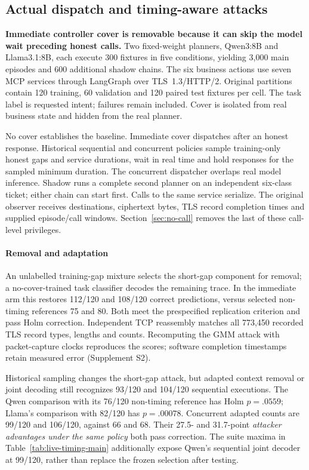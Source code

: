 \subsection{Actual dispatch and timing-aware attacks}\label{sec:cover-study}
\textbf{Immediate controller cover is removable because it can skip the model wait preceding honest calls.}
Two fixed-weight planners, Qwen3:8B and Llama3.1:8B, each execute 300 fixtures in five conditions, yielding 3,000 main episodes and 600 additional shadow chains. The six business actions use seven MCP services through LangGraph over TLS~1.3/HTTP/2. Original partitions contain 120 training, 60 validation and 120 paired test fixtures per cell. The task label is requested intent; failures remain included. Cover is isolated from real business state and hidden from the real planner.

No cover establishes the baseline. Immediate cover dispatches after an honest response. Historical sequential and concurrent policies sample training-only honest gaps and service durations, wait in real time and hold responses for the sampled minimum duration. The concurrent dispatcher overlaps real model inference. Shadow runs a complete second planner on an independent six-class ticket; either chain can start first. Calls to the same service serialize. The original observer receives destinations, ciphertext bytes, TLS record completion times and supplied episode/call windows. Section~\ref{sec:no-call} removes the last of these call-level privileges.



\paragraph{Removal and adaptation}
An unlabelled training-gap mixture selects the short-gap component for removal; a no-cover-trained task classifier decodes the remaining trace. In the immediate arm this restores 112/120 and 108/120 correct predictions, versus selected non-timing references 75 and 80. Both meet the prespecified replication criterion and pass Holm correction. Independent TCP reassembly matches all 773,450 recorded TLS record types, lengths and counts. Recomputing the GMM attack with packet-capture clocks reproduces the scores; software completion timestamps retain measured error (Supplement S2).

Historical sampling changes the short-gap attack, but adapted context removal or joint decoding still recognizes 93/120 and 104/120 sequential executions. The Qwen comparison with its 76/120 non-timing reference has Holm $p=.0559$; Llama's comparison with 82/120 has $p=.00078$. Concurrent adapted counts are 99/120 and 106/120, against 66 and 68. Their 27.5- and 31.7-point \emph{attacker advantages under the same policy} both pass correction. The suite maxima in Table~\ref{tab:live-timing-main} additionally expose Qwen's sequential joint decoder at 99/120, rather than replace the frozen selection after testing.

